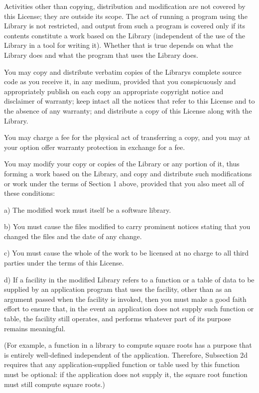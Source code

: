 Activities other than copying, distribution and modification are not covered by this License; they are outside its scope. The act of running a program using the Library is not restricted, and output from such a program is covered only if its contents constitute a work based on the Library (independent of the use of the Library in a tool for writing it). Whether that is true depends on what the Library does and what the program that uses the Library does.


\begin{DoxyEnumerate}
\item You may copy and distribute verbatim copies of the Library\textquotesingle{}s complete source code as you receive it, in any medium, provided that you conspicuously and appropriately publish on each copy an appropriate copyright notice and disclaimer of warranty; keep intact all the notices that refer to this License and to the absence of any warranty; and distribute a copy of this License along with the Library.
\end{DoxyEnumerate}

You may charge a fee for the physical act of transferring a copy, and you may at your option offer warranty protection in exchange for a fee.


\begin{DoxyEnumerate}
\item You may modify your copy or copies of the Library or any portion of it, thus forming a work based on the Library, and copy and distribute such modifications or work under the terms of Section 1 above, provided that you also meet all of these conditions\+: \begin{DoxyVerb}a) The modified work must itself be a software library.

b) You must cause the files modified to carry prominent notices
stating that you changed the files and the date of any change.

c) You must cause the whole of the work to be licensed at no
charge to all third parties under the terms of this License.

d) If a facility in the modified Library refers to a function or a
table of data to be supplied by an application program that uses
the facility, other than as an argument passed when the facility
is invoked, then you must make a good faith effort to ensure that,
in the event an application does not supply such function or
table, the facility still operates, and performs whatever part of
its purpose remains meaningful.

(For example, a function in a library to compute square roots has
a purpose that is entirely well-defined independent of the
application.  Therefore, Subsection 2d requires that any
application-supplied function or table used by this function must
be optional: if the application does not supply it, the square
root function must still compute square roots.)
\end{DoxyVerb}

\end{DoxyEnumerate}

